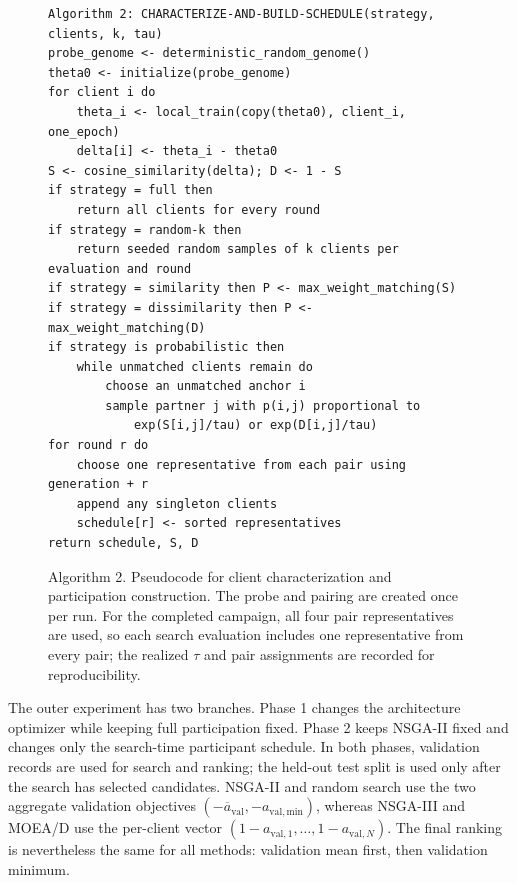 \documentclass[11pt]{article}
\begin{document}
\begin{figure}[H]
\centering
\begin{minipage}{0.96\linewidth}
\begin{verbatim}
Algorithm 2: CHARACTERIZE-AND-BUILD-SCHEDULE(strategy, clients, k, tau)
probe_genome <- deterministic_random_genome()
theta0 <- initialize(probe_genome)
for client i do
    theta_i <- local_train(copy(theta0), client_i, one_epoch)
    delta[i] <- theta_i - theta0
S <- cosine_similarity(delta); D <- 1 - S
if strategy = full then
    return all clients for every round
if strategy = random-k then
    return seeded random samples of k clients per evaluation and round
if strategy = similarity then P <- max_weight_matching(S)
if strategy = dissimilarity then P <- max_weight_matching(D)
if strategy is probabilistic then
    while unmatched clients remain do
        choose an unmatched anchor i
        sample partner j with p(i,j) proportional to
            exp(S[i,j]/tau) or exp(D[i,j]/tau)
for round r do
    choose one representative from each pair using generation + r
    append any singleton clients
    schedule[r] <- sorted representatives
return schedule, S, D
\end{verbatim}
\end{minipage}
\caption{Algorithm 2. Pseudocode for client characterization and participation construction. The probe and pairing are created once per run. For the completed campaign, all four pair representatives are used, so each search evaluation includes one representative from every pair; the realized $\tau$ and pair assignments are recorded for reproducibility.}
\label{alg:schedule}
\end{figure}

The outer experiment has two branches. Phase 1 changes the architecture optimizer while keeping full participation fixed. Phase 2 keeps NSGA-II fixed and changes only the search-time participant schedule. In both phases, validation records are used for search and ranking; the held-out test split is used only after the search has selected candidates. NSGA-II and random search use the two aggregate validation objectives $(-\overline{a}_{\mathrm{val}},-a_{\mathrm{val,min}})$, whereas NSGA-III and MOEA/D use the per-client vector $(1-a_{\mathrm{val},1},\ldots,1-a_{\mathrm{val},N})$. The final ranking is nevertheless the same for all methods: validation mean first, then validation minimum.
\end{document}
